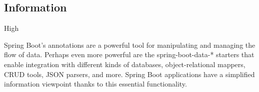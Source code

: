 \subsection*{Information}

\ranking High

Spring Boot's annotations are a powerful tool for manipulating and managing the flow of data. Perhaps even more powerful are the spring-boot-data-* starters that enable integration with different kinds of databases, object-relational mappers, CRUD tools, JSON parsers, and more. Spring Boot applications have a simplified information viewpoint thanks to this essential functionality.